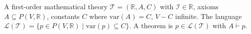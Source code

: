 A first-order mathematical theory $\mathcal{T} = (\mathbb{R}, A, C)$ with $\mathcal{I} \in \mathbb{R}$, axioms $A \subseteq P(V, \mathbb{R})$, constants $C$ where $\text{var}(A)=C$, $V-C$ infinite. The language $\mathcal{L}(\mathcal{T}) = \{p \in P(V, \mathbb{R}) \mid \text{var}(p) \subseteq C\}$. A theorem is $p \in \mathcal{L}(\mathcal{T})$ with $A \vdash p$.
